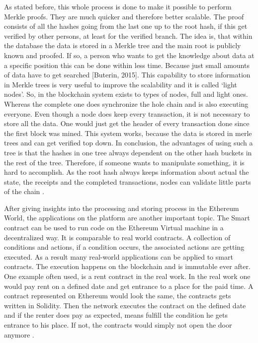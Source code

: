 As stated before, this whole process is done to make it possible to perform Merkle proofs. 
They are much quicker and therefore better scalable. 
The proof consists of all the hashes going from the last one up to the root hash, if this get verified by other persons, at least for the verified branch. 
The idea is, that within the database the data is stored in a Merkle tree and the main root is publicly known and proofed. 
If so, a person who wants to get the knowledge about data at a specific position this can be done within less time. 
Because just small amounts of data have to get searched [Buterin, 2015].
This capability to store information in Merkle trees is very useful to improve the scalability and it is called ‘light nodes’. 
So, in the blockchain system exists to types of nodes, full and light ones. 
Whereas the complete one does synchronize the hole chain and is also executing everyone. 
Even though a node does keep every transaction, it is not necessary to store all the data. 
One would just get the header of every transaction done since the first block was mined. 
This system works, because the data is stored in merle trees and can get verified top down. 
In conclusion, the advantages of using such a tree is that the hashes in one tree always dependent on the other hash buckets in the rest of the tree. 
Therefore, if someone wants to manipulate something, it is hard to accomplish. 
As the root hash always keeps information about actual the state, the receipts and the completed transactions, nodes can validate little parts of the chain \cite{Kasireddz2017}.

After giving insights into the processing and storing process in the Ethereum World, the applications on the platform are another important topic.
The Smart contract can be used to run code on the Ethereum Virtual machine in a decentralized way. 
It is comparable to real world contracts. 
A collection of conditions and actions, if a condition occurs, the associated actions are getting executed. 
As a result many real-world applications can be applied to smart contracts. 
The execution happens on the blockchain and is immutable ever after. 
One example often used, is a rent contract in the real work. 
In the real work one would pay rent on a defined date and get entrance to a place for the paid time. A contract represented on Ethereum would look the same, the contracts gets written in Solidity. 
Then the network executes the contract on the defined date and if the renter does pay as expected, means fulfill the condition he gets entrance to his place. If not, the contracts would simply not open the door anymore \cite{Dannen2017IES3103305}.

